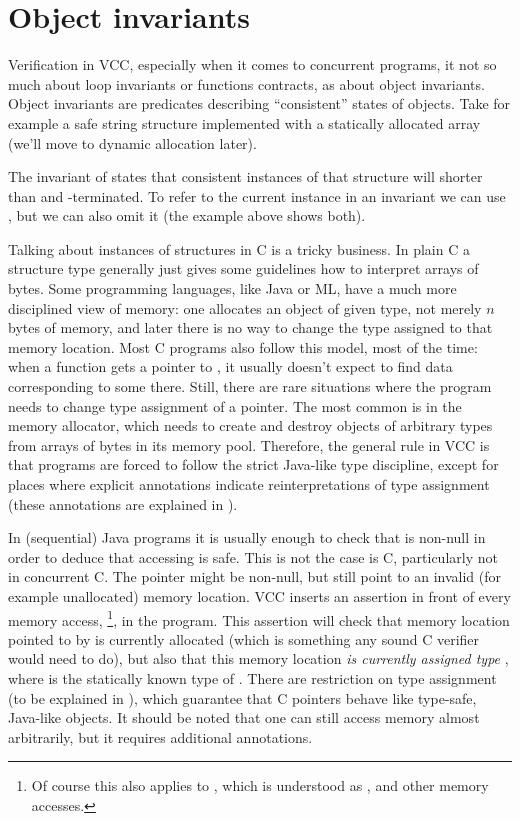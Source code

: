 \section{Object invariants}

Verification in VCC, especially when it comes to concurrent programs,
it not so much about loop invariants or functions contracts,
as about object invariants.
Object invariants are predicates describing ``consistent'' states of objects.
Take for example a safe string structure implemented with a
statically allocated array (we'll move to dynamic allocation later).


\noindent
The invariant of  states that consistent instances
of that structure will shorter than  and -terminated.
To refer to the current instance in an invariant we can use \vcc{\this}, but
we can also omit it (the example above shows both).

Talking about instances of structures in C is a tricky business. 
In plain C a structure type generally just gives some guidelines how to interpret
arrays of bytes.
Some programming languages, like Java or ML, have a much more disciplined
view of memory:
one allocates an object of given type, not merely $n$ bytes of memory,
and later there is no way to change the type assigned to that memory location.
Most C programs also follow this model, most of the time:
when a function gets a pointer to , it usually doesn't
expect to find data corresponding to some  there.
Still, there are rare situations where the program needs to
change type assignment of a pointer.
The most common is in the memory allocator, which needs to create
and destroy objects of arbitrary types from arrays of bytes
in its memory pool.
Therefore, the general rule in VCC is that programs are forced to
follow the strict Java-like type discipline, except for places
where explicit annotations indicate reinterpretations of type assignment
(these annotations are explained in ).

In (sequential) Java programs it is usually enough to check that
 is non-null in order to deduce that accessing  is safe.
This is not the case is C, particularly not in concurrent C.
The pointer  might be non-null, but still point to an invalid
(for example unallocated) memory location.
VCC inserts an assertion in front of every memory access,
%
\footnote{
  Of course this also applies to , which is understood
  as , and other memory accesses.
}, in the program. 
This assertion will check that memory location pointed to by 
is currently allocated (which is something any sound C verifier
would need to do), but also that this memory location 
\emph{is currently assigned type} , where  is the
statically known type of .
There are restriction on type assignment (to be explained in ), which guarantee
that C pointers behave like type-safe, Java-like objects.
It should be noted that one can still access memory almost arbitrarily,
but it requires additional annotations.

